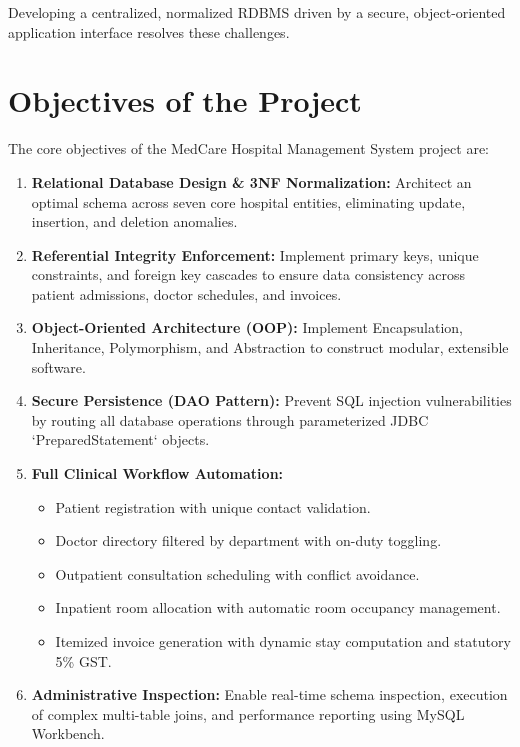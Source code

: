 \documentclass[12pt,a4paper]{article}
\begin{document}
Developing a centralized, normalized RDBMS driven by a secure, object-oriented application interface resolves these challenges.

\section{Objectives of the Project}
\label{sec:obj}

The core objectives of the MedCare Hospital Management System project are:
\begin{enumerate}[noitemsep]
    \item \textbf{Relational Database Design \& 3NF Normalization:} Architect an optimal schema across seven core hospital entities, eliminating update, insertion, and deletion anomalies.
    \item \textbf{Referential Integrity Enforcement:} Implement primary keys, unique constraints, and foreign key cascades to ensure data consistency across patient admissions, doctor schedules, and invoices.
    \item \textbf{Object-Oriented Architecture (OOP):} Implement Encapsulation, Inheritance, Polymorphism, and Abstraction to construct modular, extensible software.
    \item \textbf{Secure Persistence (DAO Pattern):} Prevent SQL injection vulnerabilities by routing all database operations through parameterized JDBC `PreparedStatement` objects.
    \item \textbf{Full Clinical Workflow Automation:}
    \begin{itemize}[noitemsep]
        \item Patient registration with unique contact validation.
        \item Doctor directory filtered by department with on-duty toggling.
        \item Outpatient consultation scheduling with conflict avoidance.
        \item Inpatient room allocation with automatic room occupancy management.
        \item Itemized invoice generation with dynamic stay computation and statutory 5\% GST.
    \end{itemize}
    \item \textbf{Administrative Inspection:} Enable real-time schema inspection, execution of complex multi-table joins, and performance reporting using MySQL Workbench.
\end{enumerate}
\end{document}
